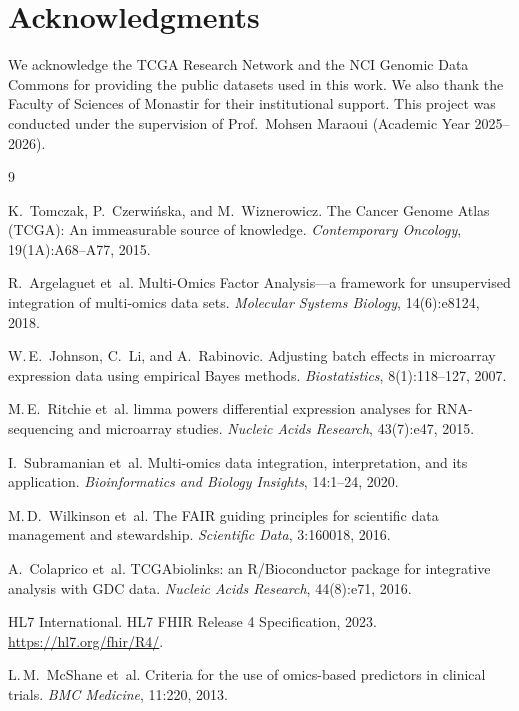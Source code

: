 \documentclass[sigconf,nonacm]{acmart}
\begin{document}
\section*{Acknowledgments}
We acknowledge the TCGA Research Network and the NCI Genomic Data Commons for providing the public datasets used in this work. We also thank the Faculty of Sciences of Monastir for their institutional support. This project was conducted under the supervision of Prof.\ Mohsen Maraoui (Academic Year 2025--2026).


\begin{thebibliography}{9}

K.~Tomczak, P.~Czerwi{\'n}ska, and M.~Wiznerowicz.
\newblock The Cancer Genome Atlas (TCGA): An immeasurable source of knowledge.
\newblock \emph{Contemporary Oncology}, 19(1A):A68--A77, 2015.

R.~Argelaguet et~al.
\newblock Multi-Omics Factor Analysis---a framework for unsupervised integration of multi-omics data sets.
\newblock \emph{Molecular Systems Biology}, 14(6):e8124, 2018.

W.\,E.~Johnson, C.~Li, and A.~Rabinovic.
\newblock Adjusting batch effects in microarray expression data using empirical Bayes methods.
\newblock \emph{Biostatistics}, 8(1):118--127, 2007.

M.\,E.~Ritchie et~al.
\newblock limma powers differential expression analyses for RNA-sequencing and microarray studies.
\newblock \emph{Nucleic Acids Research}, 43(7):e47, 2015.

I.~Subramanian et~al.
\newblock Multi-omics data integration, interpretation, and its application.
\newblock \emph{Bioinformatics and Biology Insights}, 14:1--24, 2020.

M.\,D.~Wilkinson et~al.
\newblock The FAIR guiding principles for scientific data management and stewardship.
\newblock \emph{Scientific Data}, 3:160018, 2016.

A.~Colaprico et~al.
\newblock TCGAbiolinks: an R/Bioconductor package for integrative analysis with GDC data.
\newblock \emph{Nucleic Acids Research}, 44(8):e71, 2016.

{HL7 International}.
\newblock HL7 FHIR Release 4 Specification, 2023.
\newblock \url{https://hl7.org/fhir/R4/}.

L.\,M.~McShane et~al.
\newblock Criteria for the use of omics-based predictors in clinical trials.
\newblock \emph{BMC Medicine}, 11:220, 2013.


\end{thebibliography}
\end{document}
